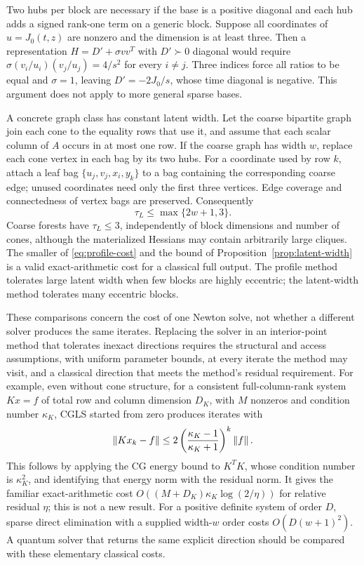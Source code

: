 Two hubs per block are necessary if the base is a positive diagonal and
each hub adds a signed rank-one term on a generic block. Suppose all
coordinates of $u=J_0(t,z)$ are nonzero and the dimension is at least
three. Then a representation
$H=D'+\sigma vv^T$ with $D'\succ0$ diagonal would require
$\sigma(v_i/u_i)(v_j/u_j)=4/s^2$ for every $i\ne j$.
Three indices force all ratios to be equal and $\sigma=1$, leaving
$D'=-2J_0/s$, whose time diagonal is negative. This argument does not
apply to more general sparse bases.

A concrete graph class has constant latent width. Let the coarse bipartite
graph join each cone to the equality rows that use it, and assume that
each scalar column of $A$ occurs in at most one row. If the coarse graph
has width $w$, replace each cone vertex in each bag by its two hubs. For
a coordinate used by row $k$, attach a leaf bag $\{u_j,v_j,x_i,y_k\}$ to
a bag containing the corresponding coarse edge; unused coordinates need
only the first three vertices. Edge coverage and connectedness of vertex
bags are preserved. Consequently
\[
                    \tau_L\leq\max\{2w+1,3\}.
\]
Coarse forests have $\tau_L\leq3$, independently of block dimensions and
number of cones, although the materialized Hessians may contain
arbitrarily large cliques. The smaller of \eqref{eq:profile-cost} and the
bound of Proposition~\ref{prop:latent-width} is a valid exact-arithmetic
cost for a classical full output. The profile method tolerates large
latent width when few blocks are highly eccentric; the latent-width method
tolerates many eccentric blocks.

These comparisons concern the cost of one Newton solve, not whether a
different solver produces the same iterates. Replacing the solver in an
interior-point method that tolerates inexact directions requires the
structural and access assumptions, with uniform parameter bounds, at
every iterate the method may visit,
and a classical direction that meets the method's residual requirement.
For example, even without cone structure, for a consistent
full-column-rank system $Kx=f$ of total row and column dimension $D_K$,
with $M$ nonzeros and condition number $\kappa_K$, CGLS started from zero
produces iterates with
\[
 \left\lVert Kx_k-f\right\rVert\leq
 2\left(\frac{\kappa_K-1}{\kappa_K+1}\right)^k\left\lVert f\right\rVert.
\]
This follows by applying the CG energy bound to $K^TK$, whose condition number
is $\kappa_K^2$, and identifying that energy norm with the residual norm.
It gives the familiar exact-arithmetic cost
$O((M+D_K)\kappa_K\log(2/\eta))$ for relative residual $\eta$; this is not
a new result. For a positive definite system of order $D$, sparse direct
elimination with a supplied width-$w$ order costs $O(D(w+1)^2)$. A
quantum solver that returns the same explicit direction should be
compared with these elementary classical costs.

